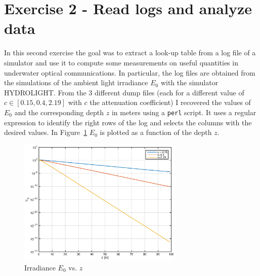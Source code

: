 \documentclass[10pt]{article}
\begin{document}
\section*{Exercise 2 - Read logs and analyze data}
In this second exercise the goal was to extract a look-up table from a log file of a simulator and use it to compute some measurements on useful quantities in underwater optical communications. In particular, the log files are obtained from the simulations of the ambient light irradiance $E_0$ with the simulator HYDROLIGHT. From the 3 different dump files (each for a different value of $c \in [0.15, 0.4, 2.19]$ with $c$ the attenuation coefficient) I recovered the values of $E_0$ and the corresponding depth $z$ in meters using a \texttt{perl} script. It uses a regular expression to identify the right rows of the log and selects the columns with the desired values. In Figure~\ref{fig:e0zm} $E_0$ is plotted as a function of the depth $z$.

\begin{figure}[h!]
	\centering
	\includegraphics[width = 0.7\textwidth]{e0_z}
	\caption{Irradiance $E_0$ vs. $z$}
	\label{fig:e0zm}
\end{figure}
\end{document}
